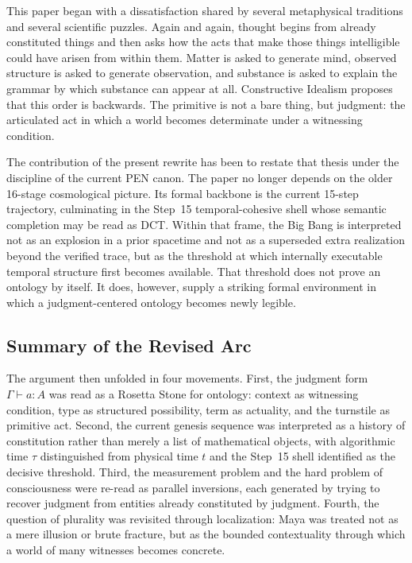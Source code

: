 \documentclass[11pt,a4paper]{article}
\theoremstyle{plain}
\theoremstyle{definition}
\theoremstyle{remark}
\begin{document}
This paper began with a dissatisfaction shared by several metaphysical traditions and several scientific puzzles.
Again and again, thought begins from already constituted things and then asks how the acts that make those things intelligible could have arisen from within them.
Matter is asked to generate mind, observed structure is asked to generate observation, and substance is asked to explain the grammar by which substance can appear at all.
Constructive Idealism proposes that this order is backwards.
The primitive is not a bare thing, but judgment: the articulated act in which a world becomes determinate under a witnessing condition.

The contribution of the present rewrite has been to restate that thesis under the discipline of the current PEN canon.
The paper no longer depends on the older 16-stage cosmological picture.
Its formal backbone is the current 15-step trajectory, culminating in the Step~15 temporal-cohesive shell whose semantic completion may be read as DCT.
Within that frame, the Big Bang is interpreted not as an explosion in a prior spacetime and not as a superseded extra realization beyond the verified trace, but as the threshold at which internally executable temporal structure first becomes available.
That threshold does not prove an ontology by itself.
It does, however, supply a striking formal environment in which a judgment-centered ontology becomes newly legible.

\subsection{Summary of the Revised Arc}
\label{subsec:summary}

The argument then unfolded in four movements.
First, the judgment form $\Gamma \vdash a : A$ was read as a Rosetta Stone for ontology: context as witnessing condition, type as structured possibility, term as actuality, and the turnstile as primitive act.
Second, the current genesis sequence was interpreted as a history of constitution rather than merely a list of mathematical objects, with algorithmic time $\tau$ distinguished from physical time $t$ and the Step~15 shell identified as the decisive threshold.
Third, the measurement problem and the hard problem of consciousness were re-read as parallel inversions, each generated by trying to recover judgment from entities already constituted by judgment.
Fourth, the question of plurality was revisited through localization: Maya was treated not as a mere illusion or brute fracture, but as the bounded contextuality through which a world of many witnesses becomes concrete.
\end{document}
